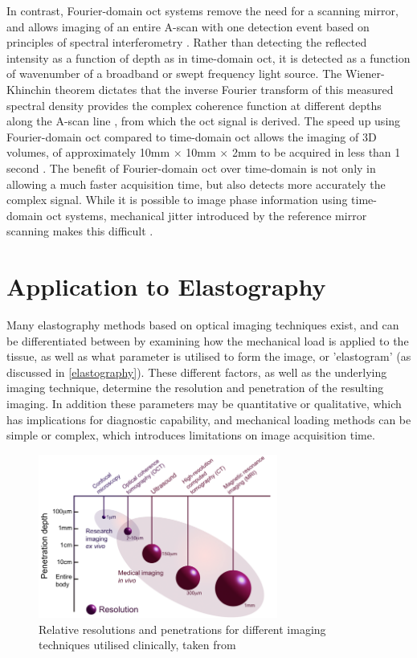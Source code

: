 In contrast, Fourier-domain \ac{oct} systems remove the need for a scanning mirror, and allows imaging of an entire A-scan with one detection event based on principles of spectral interferometry \cite{chin_parametric_2016}. Rather than detecting the reflected intensity as a function of depth as in time-domain \ac{oct}, it is detected as a function of wavenumber of a broadband or swept frequency light source. The Wiener-Khinchin theorem dictates that the inverse Fourier transform of this measured spectral density provides the complex coherence function at different depths along the A-scan line \cite{schmitt_optical_1999}, from which the \ac{oct} signal is derived. The speed up using Fourier-domain \ac{oct} compared to time-domain \ac{oct} allows the imaging of 3D volumes, of approximately 10mm $\times$ 10mm $\times$ 2mm to be acquired in less than 1 second \cite{kennedy_emergence_2017}. The benefit of Fourier-domain \ac{oct} over time-domain is not only in allowing a much faster acquisition time, but also detects more accurately the complex signal. While it is possible to image phase information using time-domain \ac{oct} systems, mechanical jitter introduced by the reference mirror scanning makes this difficult \cite{wijesinghe_improving_2017}.

\section{Application to Elastography}\label{application_elastography}

Many elastography methods based on optical imaging techniques exist, and can be differentiated between by examining how the mechanical load is applied to the tissue, as well as what parameter is utilised to form the image, or 'elastogram' (as discussed in \autoref{elastography}). These different factors, as well as the underlying imaging technique, determine the resolution and penetration of the resulting imaging. In addition these parameters may be quantitative or qualitative, which has implications for diagnostic capability, and mechanical loading methods can be simple or complex, which introduces limitations on image acquisition time.

\begin{figure}[t]
	\centering
    	\includegraphics[width=0.7\textwidth]{bground_figs/technique_comparison.png}
    	\caption{Relative resolutions and penetrations for different imaging techniques utilised clinically, taken from \cite{optical+biomedical_engineering_laboratory_introduction_nodate}}
    	\label{image_techniques}	
\end{figure}

